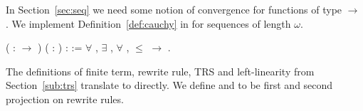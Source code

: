 In Section~\ref{sec:seq} we need some notion of convergence for functions of
type
$\rightarrow$
. We implement
Definition~\ref{def:cauchy} in \Coq for sequences of length $\omega$.
\begin{singlespace}
\begin{coqdoccode}
\coqdocnoindent
{}
( :
\ensuremath{\rightarrow} )
( : ) :
 :=\coqdoceol
\coqdocindent{1.00em}
\ensuremath{\forall} , \ensuremath{\exists} ,
\ensuremath{\forall} ,
 \ensuremath{\le} 
\ensuremath{\rightarrow}
 
.\coqdoceol
\end{coqdoccode}
\end{singlespace}
The definitions of finite term, rewrite rule, TRS and left-linearity
from Section~\ref{sub:trs} translate to \Coq directly. We define
 and
 to be first and
second projection on rewrite rules.

